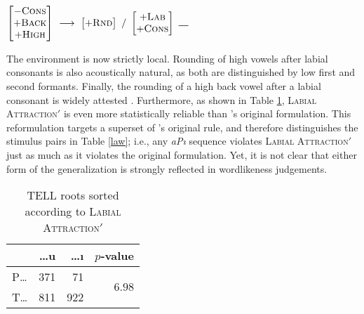 \begin{shortexample}
$\begin{bmatrix} -\textsc{Cons} \\ +\textsc{Back} \\ +\textsc{High} \end{bmatrix}~\goesto~\begin{bmatrix} +\textsc{Rnd} \end{bmatrix}~/~\begin{bmatrix} +\textsc{Lab} \\ +\textsc{Cons} \end{bmatrix}~\gap{}$
\end{shortexample}

\noindent
The environment is now strictly local.
Rounding of high vowels after labial consonants is also acoustically natural, as both are distinguished by low first and second formants.
Finally, the rounding of a high back vowel after a labial consonant is widely attested \citep[e.g.,][]{Vaux1993}.
Furthermore, as shown in Table \ref{lasi}, \textsc{Labial Attraction}$'$ is even more statistically reliable than \citeauthor{Lees1966a}'s original formulation.
This reformulation targets a superset of \citeauthor{Lees1966b}'s original rule, and therefore distinguishes the stimulus pairs in Table \ref{law}; i.e., any \emph{aPı} sequence violates \textsc{Labial Attraction}$'$ just as much as it violates the original formulation.
Yet, it is not clear that either form of the generalization is strongly reflected in wordlikeness judgements.

\begin{table}[t]
\centering
\begin{tabular}{lrrr}
\toprule
       & \ldots{}u  & \ldots{}ı & $p$-value                      \\
\midrule
P\ldots{}  & 371    & 71        & \multirow{2}{*}{$6.98$\e{-49}} \\
T\ldots{}  & 811    & 922       &                                \\
\bottomrule
\end{tabular}
\caption{TELL roots sorted according to \textsc{Labial Attraction}$'$}
\label{lasi}
\end{table}



